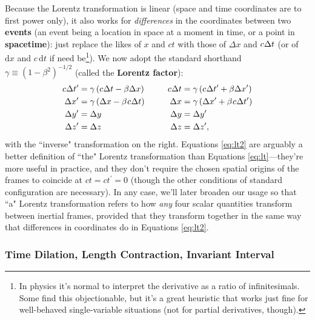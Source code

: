 \documentclass[12pt]{article}
\newcommand{\dd}[1]{\mathrm{d}#1}
\begin{document}
Because the Lorentz transformation is linear (space and time coordinates are to first power only), it also works for \emph{differences} in the coordinates between two \textbf{events} (an event being a location in space at a moment in time, or a point in \textbf{spacetime}): just replace the likes of $x$ and $ct$ with those of $\Delta x$ and $c \mkern.5mu \Delta t$ (or of $\dd x$ and $c \, \dd t$ if need be\footnote{\label{fn:in}In physics it's normal to interpret the derivative as a ratio of infinitesimals. Some find this objectionable, but it's a great heuristic that works just fine for well-behaved single-variable situations (not for partial derivatives, though).}). We now adopt the standard shorthand $\gamma \equiv (1 - \beta^2)^{-1/2}$ (called the \textbf{Lorentz factor}):
\begin{equation}\label{eq:lt2}
\begin{aligned}
c \mkern.5mu \Delta t^{\prime} &= \gamma \left( c \mkern.5mu \Delta t - \beta \Delta x \right) & c \mkern.5mu \Delta t &= \gamma \left( c \mkern.5mu \Delta t^\prime + \beta \Delta x^\prime \right) \\
\Delta x^{\prime} &= \gamma \left( \Delta x - \beta \mkern1mu c \mkern.5mu \Delta t \right) & \qquad \Delta x &= \gamma \left( \Delta x^\prime + \beta \mkern1mu c \mkern.5mu \Delta t^\prime \right) \\
\Delta y^{\prime} &= \Delta y& \Delta y&= \Delta y^\prime \\
\Delta z^{\prime} &= \Delta z& \Delta z&= \Delta z^\prime ,
\end{aligned}
\end{equation}
with the ``inverse" transformation on the right. Equations \ref{eq:lt2} are arguably a better definition of ``the" Lorentz transformation than Equations \ref{eq:lt}---they're more useful in practice, and they don't require the chosen spatial origins of the frames to coincide at $ct = ct^\prime = 0$ (though the other conditions of standard configuration are necessary). In any case, we'll later broaden our usage so that ``a" Lorentz transformation refers to how \emph{any} four scalar quantities transform between inertial frames, provided that they transform together in the same way that differences in coordinates do in Equations \ref{eq:lt2}.



\subsubsection{Time Dilation, Length Contraction, Invariant Interval}\label{sssec:td}
\end{document}
